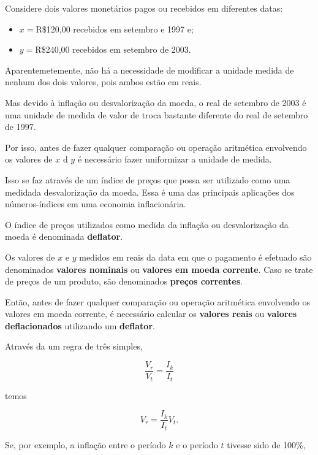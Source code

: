 \documentclass[
]{book}
\begin{document}
Considere dois valores monetários pagos ou recebidos em diferentes datas:

\begin{itemize}
\item
  \(x=\)R\$120,00 recebidos em setembro e 1997 e;
\item
  \(y=\)R\$240,00 recebidos em setembro de 2003.
\end{itemize}

Aparentemetemente, não há a necessidade de modificar a unidade medida de nenhum dos dois valores, pois ambos estão em reais.

Mas devido à inflação ou desvalorização da moeda, o real de setembro de 2003 é uma unidade de medida de valor de troca bastante diferente do real de setembro de 1997.

Por isso, antes de fazer qualquer comparação ou operação aritmética envolvendo os valores de \(x\) d \(y\) é necessário fazer uniformizar a unidade de medida.

Isso se faz através de um índice de preços que possa ser utilizado como uma medidada desvalorização da moeda. Essa é uma das principais aplicações dos números-índices em uma economia inflacionária.

O índice de preços utilizados como medida da inflação ou desvalorização da moeda é denominada \textbf{deflator}.

Os valores de \(x\) e \(y\) medidos em reais da data em que o pagamento é efetuado são denominados \textbf{valores nominais} ou \textbf{valores em moeda corrente}. Caso se trate de preços de um produto, são denominados \textbf{preços correntes}.

Então, antes de fazer qualquer comparação ou operação aritmética envolvendo os valores em moeda corrente, é necessário calcular os \textbf{valores reais} ou \textbf{valores deflacionados} utilizando um \textbf{deflator}.

Através da um regra de três simples,

\begin{equation}
  \frac{V_r}{V_t} = \frac{I_k}{I_t}
\end{equation}

temos

\begin{equation}
  V_r = \frac{I_k}{I_t}V_t.
  \label{eq:ValorReal}
\end{equation}

Se, por exemplo, a inflação entre o período \(k\) e o período \(t\) tivesse sido de 100\%,
\end{document}
